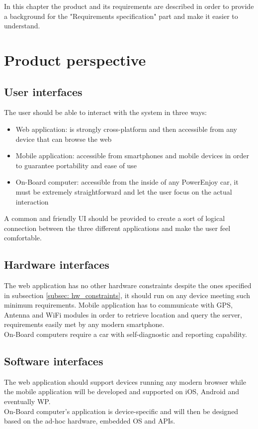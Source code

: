In this chapter the product and its requirements are described in order to provide a background for the "Requirements specification" part and make it easier to understand.

\section{Product perspective}
\subsection{User interfaces} %
\label{subsec:user_interfaces}
The user should be able to interact with the system in three ways:
\begin{itemize}
	\item{Web application}: is strongly cross-platform and then accessible from any device that can browse the web
	\item{Mobile application}: accessible from smartphones and mobile devices in order to guarantee portability and ease of use
	\item{On-Board computer}: accessible from the inside of any PowerEnjoy car, it must be extremely straightforward and let the user focus on the actual interaction
\end{itemize}
A common and friendly UI should be provided to create a sort of logical connection between the three different applications and make the user feel comfortable.

\subsection{Hardware interfaces}
The web application has no other hardware constraints despite the ones specified in subsection \ref{subsec: hw_constraints}, it should run on any device meeting such minimum requirements. Mobile application has to communicate with GPS, Antenna and WiFi modules in order to retrieve location and query the server, requirements easily met by any modern smartphone.
\\On-Board computers require a car with self-diagnostic and reporting capability.
\subsection{Software interfaces}
The web application should support devices running any modern browser while the mobile application will be developed and supported on iOS, Android and eventually WP. 
\\On-Board computer's application is device-specific and will then be designed based on the ad-hoc hardware, embedded OS and APIs.
